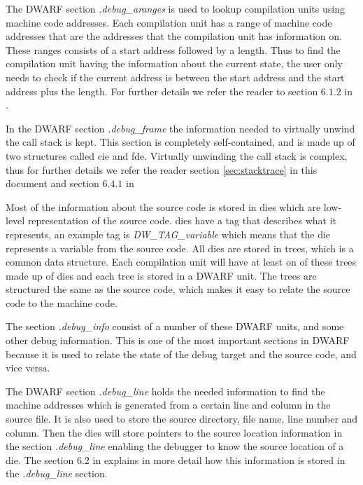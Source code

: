 The \gls{DWARF} section \emph{.debug\_aranges} is used to lookup compilation units using machine code addresses.
Each compilation unit has a range of machine code addresses that are the addresses that the compilation unit has information on.
These ranges consists of a start address followed by a length.
Thus to find the compilation unit having the information about the current state, the user only needs to check if the current address is between the start address and the start address plus the length.
For further details we refer the reader to section $6.1.2$ in \cite{dwarf}.


In the \gls{DWARF} section \emph{.debug\_frame} the information needed to virtually unwind the call stack is kept.
This section is completely self-contained, and is made up of two structures called \acrfull{cie} and \acrfull{fde}.
Virtually unwinding the call stack is complex, thus for further details we refer the reader section \ref{sec:stacktrace} in this document and section $6.4.1$ in \cite{dwarf}


Most of the information about the source code is stored in \glspl{die} which are low-level representation of the source code.
\glspl{die} have a tag that describes what it represents, an example tag is \emph{DW\_TAG\_variable} which means that the \gls{die} represents a variable from the source code.
All \glspl{die} are stored in trees, which is a common data structure.
Each compilation unit will have at least on of these trees made up of \glspl{die} and each tree is stored in a \gls{DWARF} unit.
The trees are structured the same as the source code, which makes it easy to relate the source code to the machine code.

The section \emph{.debug\_info} consist of a number of these \gls{DWARF} units, and some other debug information.
This is one of the most important sections in \gls{DWARF} because it is used to relate the state of the debug target and the source code, and vice versa.


The \gls{DWARF} section \emph{.debug\_line} holds the needed information to find the machine addresses which is generated from a certain line and column in the source file.
It is also used to store the source directory, file name, line number and column.
Then the \glspl{die} will store pointers to the source location information in the section \emph{.debug\_line} enabling the debugger to know the source location of a \gls{die}.
The section $6.2$ in \cite{dwarf} explains in more detail how this information is stored in the \emph{.debug\_line} section.


